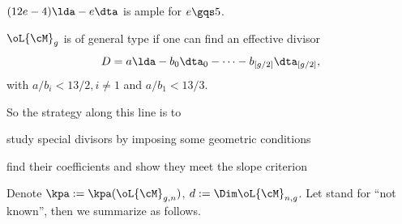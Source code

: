 \documentclass[a4paper, twoside]{article}
\begin{document}
\begin{thm}
	$(12e-4)\lda-e\dta$ is ample for $e\gqs5$.
\end{thm}

\begin{cor}
	$\oL{\cM}_{g}$ is of general type if one can find an effective divisor
	\[
		D=a\lda-b_{0}\dta_{0}-\cdots-b_{[g/2]}\dta_{[g/2]},
	\]
	with $a/b_{i}<13/2, i\neq1$ and $a/b_{1}<13/3$.
\end{cor}

\begin{rmk}
	So the strategy along this line is to
	\begin{enr}
		\item study special divisors by imposing some geometric conditions
		\item find their coefficients and show they meet the slope criterion
	\end{enr}
\end{rmk}



Denote $\kpa:=\kpa(\oL{\cM}_{g,n})$, $d:=\Dim\oL{\cM}_{n,g}$. Let  stand for ``not known'', then we summarize as follows.
\end{document}
